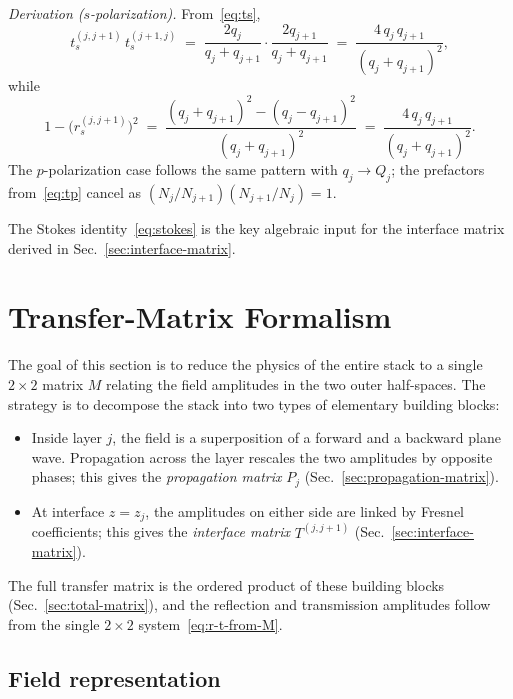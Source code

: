\documentclass[aps,prb,onecolumn,superscriptaddress,nofootinbib,11pt]{revtex4-2}
\begin{document}
\emph{Derivation ($s$-polarization).} From~\eqref{eq:ts},
\begin{equation}
  t_s^{(j,j+1)}\, t_s^{(j+1,j)} \;=\; \frac{2 q_j}{q_j + q_{j+1}} \cdot \frac{2 q_{j+1}}{q_j + q_{j+1}} \;=\; \frac{4\, q_j\, q_{j+1}}{(q_j + q_{j+1})^2},
\end{equation}
while
\begin{equation}
  1 - \bigl(r_s^{(j,j+1)}\bigr)^{2} \;=\; \frac{(q_j + q_{j+1})^{2} - (q_j - q_{j+1})^{2}}{(q_j + q_{j+1})^2} \;=\; \frac{4\, q_j\, q_{j+1}}{(q_j + q_{j+1})^2}.
\end{equation}
The $p$-polarization case follows the same pattern with $q_j \to Q_j$; the prefactors from~\eqref{eq:tp} cancel as $(N_j/N_{j+1})(N_{j+1}/N_j) = 1$.

The Stokes identity~\eqref{eq:stokes} is the key algebraic input for the interface matrix derived in Sec.~\ref{sec:interface-matrix}.

\section{Transfer-Matrix Formalism}
\label{sec:transfer-matrix-formalism}

The goal of this section is to reduce the physics of the entire stack to a single $2{\times}2$ matrix $M$ relating the field amplitudes in the two outer half-spaces. The strategy is to decompose the stack into two types of elementary building blocks:
\begin{itemize}
  \item Inside layer $j$, the field is a superposition of a forward and a backward plane wave. Propagation across the layer rescales the two amplitudes by opposite phases; this gives the \emph{propagation matrix} $P_j$ (Sec.~\ref{sec:propagation-matrix}).
  \item At interface $z = z_j$, the amplitudes on either side are linked by Fresnel coefficients; this gives the \emph{interface matrix} $T^{(j,j+1)}$ (Sec.~\ref{sec:interface-matrix}).
\end{itemize}
The full transfer matrix is the ordered product of these building blocks (Sec.~\ref{sec:total-matrix}), and the reflection and transmission amplitudes follow from the single $2{\times}2$ system~\eqref{eq:r-t-from-M}.

\subsection{Field representation}
\label{sec:field-representation}
\end{document}
